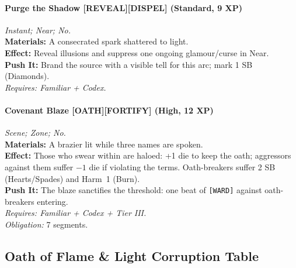 \paragraph{Purge the Shadow \textnormal{[REVEAL][DISPEL]} (Standard, 9 XP)} \emph{Instant; Near; No.}\\
\textbf{Materials:} A consecrated spark shattered to light.\\
\textbf{Effect:} Reveal illusions and suppress one ongoing glamour/curse in Near.\\
\textbf{Push It:} Brand the source with a visible tell for this arc; mark 1 SB (Diamonds).\\
\emph{Requires: Familiar + Codex.}

\paragraph{Covenant Blaze \textnormal{[OATH][FORTIFY]} (High, 12 XP)} \emph{Scene; Zone; No.}\\
\textbf{Materials:} A brazier lit while three names are spoken.\\
\textbf{Effect:} Those who swear within are haloed: +1 die to keep the oath; aggressors against them suffer \(-1\) die if violating the terms. Oath-breakers suffer 2 SB (Hearts/Spades) and Harm~1 (Burn).\\
\textbf{Push It:} The blaze sanctifies the threshold: one beat of \texttt{[WARD]} against oath-breakers entering.\\
\emph{Requires: Familiar + Codex + Tier III.}\\
\emph{Obligation:} 7 segments.

\subsection*{Oath of Flame \& Light Corruption Table}
\label{sec:oath-flame-light-corruption}

